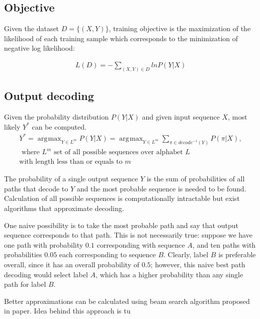 \documentclass[times, utf8, diplomski, numeric, english]{fer}
\DeclareMathOperator*{\argmax}{\arg\!\max}
\begin{document}
\subsection{Objective}
Given the dataset $D = \{(X, Y)\}$, training objective is the maximization of the likelihood of each training sample which corresponds to the minimization of negative log likelihood:

\begin{equation}
\begin{gathered}
L(D) = - \sum_{(X,Y)\in D}^{} ln P(Y | X)
\end{gathered}
\end{equation}


\subsection{Output decoding}
Given the probability distribution $P(Y | X)$ and given input sequence $X$, most likely $Y^{*}$ can be computed.
\begin{equation}
\begin{gathered}
Y^{*} = \argmax_{Y \in L^m} P(Y|X) = \argmax_{Y \in L^m} \sum_{\pi \in decode^{-1}(Y)}^{} P(\pi | X),\\
\text{~where $L^m$ set of all possible sequences over alphabet $L$ }\\
\text{with length less than or equals to $m$}
\end{gathered}
\end{equation}

The probability of a single output sequence $Y$ is the sum of probabilities of all paths that decode to $Y$ and the most probable sequence is needed to be found.
Calculation of all possible sequences is computationally intractable but exist algorithms that approximate decoding. 

One naive possibility is to take the most probable path and say that output sequence corresponds to that path.
This is not necessarily true: suppose we have one path with probability $0.1$ corresponding with sequence $A$, and ten paths with probabilities  $0.05$ each corresponding to sequence $B$. Clearly, label $B$ is preferable overall, since it has an overall probability of $0.5$; however, this naive best path decoding would select label $A$, which has a higher probability than any single path for label $B$.

Better approximations can be calculated using beam search algorithm proposed in paper\cite{graves_decode}.  
Idea behind this approach is tu 
\end{document}
